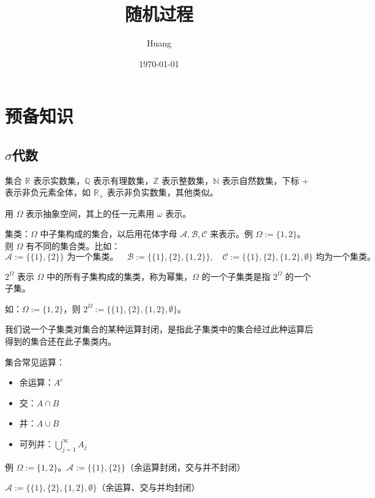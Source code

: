 \documentclass[lang=cn,10pt,thmcnt=section]{elegantbook}
\title{随机过程}
\author{Huang}
\date{\today}
\begin{document}
	
	\maketitle
	\frontmatter
	
	\tableofcontents
	
	\mainmatter
	\chapter{预备知识}
	\section{$\sigma$代数}
	集合 \(\mathbb{R}\) 表示实数集，\(\mathbb{Q}\) 表示有理数集，\(\mathbb{Z}\) 表示整数集，\(\mathbb{N}\) 表示自然数集，下标 \(+\) 表示非负元素全体，如 \(\mathbb{R}_+\) 表示非负实数集，其他类似。

	用 \(\Omega\) 表示抽象空间，其上的任一元素用 \(\omega\) 表示。

集类：\(\Omega\) 中子集构成的集合，以后用花体字母 \(\mathscr{A}, \mathscr{B}, \mathscr{C}\) 来表示。例 \(\Omega := \{1,2\}\)。则 \(\Omega\) 有不同的集合类。比如：
\[
\mathscr{A} := \{\{1\},\{2\}\} \text{ 为一个集类。} \quad
\mathscr{B} := \{\{1\},\{2\},\{1,2\}\}, \quad
\mathscr{C} := \{\{1\},\{2\},\{1,2\},\emptyset\} \text{ 均为一个集类。}
\]

\(2^\Omega\) 表示 \(\Omega\) 中的所有子集构成的集类，称为幂集，\(\Omega\) 的一个子集类是指 \(2^\Omega\) 的一个子集。

如：\(\Omega := \{1,2\}\)，则 \(2^\Omega := \{\{1\},\{2\},\{1,2\},\emptyset\}\)。

我们说一个子集类对集合的某种运算封闭，是指此子集类中的集合经过此种运算后得到的集合还在此子集类内。

集合常见运算：
\begin{itemize}
    \item 余运算：\(A^c\)
    \item 交：\(A \cap B\)
    \item 并：\(A \cup B\)
    \item 可列并：\(\bigcup_{j=1}^{\infty} A_j\)
\end{itemize}

例 \(\Omega := \{1,2\}\)。\(\mathscr{A} := \{\{1\},\{2\}\}\)（余运算封闭，交与并不封闭）

\(\mathscr{A} := \{\{1\},\{2\},\{1,2\},\emptyset\}\)（余运算、交与并均封闭）
\end{document}
